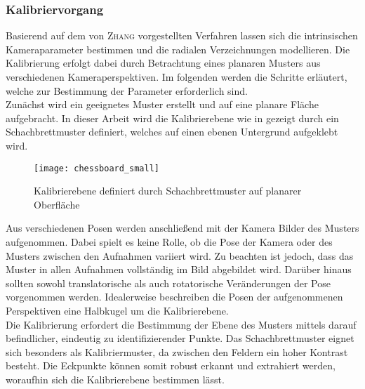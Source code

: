 \subsubsection{Kalibriervorgang}
Basierend auf dem von \textsc{Zhang} \cite{Zhang2000} vorgestellten Verfahren lassen sich die intrinsischen Kameraparameter bestimmen und die radialen Verzeichnungen modellieren. Die Kalibrierung erfolgt dabei durch Betrachtung eines planaren Musters aus verschiedenen Kameraperspektiven. Im folgenden werden die Schritte erläutert, welche zur Bestimmung der Parameter erforderlich sind.\\

Zunächst wird ein geeignetes Muster erstellt und auf eine planare Fläche aufgebracht. In dieser Arbeit wird die Kalibrierebene wie in  gezeigt durch ein Schachbrettmuster definiert, welches auf einen ebenen Untergrund aufgeklebt wird.\\

\begin{figure}[ht]
	\begin{center}
		\texttt{[image: chessboard\_small]}
		\caption{Kalibrierebene definiert durch Schachbrettmuster auf planarer Oberfläche}
		\label{fig.chesscalib}
	\end{center}
\end{figure}

Aus verschiedenen Posen werden anschließend mit der Kamera Bilder des Musters aufgenommen. Dabei spielt es keine Rolle, ob die Pose der Kamera oder des Musters zwischen den Aufnahmen variiert wird. Zu beachten ist jedoch, dass das Muster in allen Aufnahmen vollständig im Bild abgebildet wird. Darüber hinaus sollten sowohl translatorische als auch rotatorische Veränderungen der Pose vorgenommen werden. Idealerweise beschreiben die Posen der aufgenommenen Perspektiven eine Halbkugel um die Kalibrierebene.\\

Die Kalibrierung erfordert die Bestimmung der Ebene des Musters mittels darauf befindlicher, eindeutig zu identifizierender Punkte. Das Schachbrettmuster eignet sich besonders als Kalibriermuster, da zwischen den Feldern ein hoher Kontrast besteht. Die Eckpunkte können somit robust erkannt und extrahiert werden, woraufhin sich die Kalibrierebene bestimmen lässt.\\

\prever{
}

